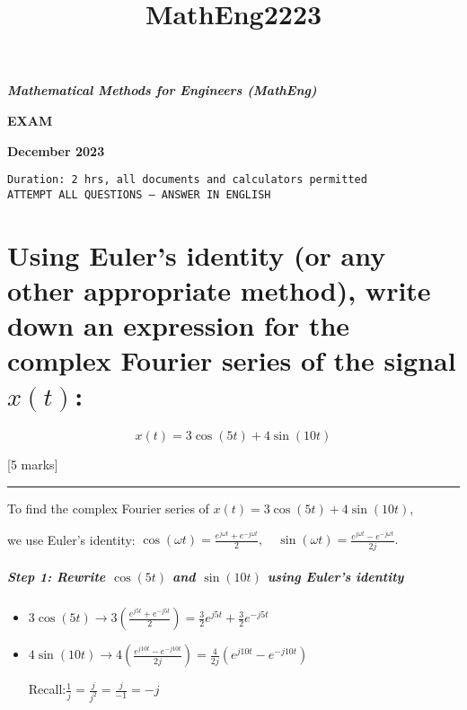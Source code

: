 \documentclass[11pt]{article}
\title{MathEng2223}
\begin{document}
    
    \maketitle
    
    

    
    \textbf{\emph{Mathematical Methods for Engineers (MathEng)}}

\textbf{EXAM}

\textbf{December 2023}

\begin{verbatim}
Duration: 2 hrs, all documents and calculators permitted
ATTEMPT ALL QUESTIONS – ANSWER IN ENGLISH
\end{verbatim}

    \section{\texorpdfstring{Using Euler's identity (or any other
appropriate method), write down an expression for the complex Fourier
series of the signal
\(x(t)\):}{Using Euler's identity (or any other appropriate method), write down an expression for the complex Fourier series of the signal x(t):}}\label{using-eulers-identity-or-any-other-appropriate-method-write-down-an-expression-for-the-complex-fourier-series-of-the-signal-xt}

\[
x(t) = 3 \cos( 5t) + 4 \sin( 10t)
\]

{[}5 marks{]}

    \begin{center}\rule{0.5\linewidth}{0.5pt}\end{center}

To find the complex Fourier series of \(x(t) = 3\cos(5t) + 4\sin(10t)\),

we use Euler's identity:
\(\cos(\omega t) = \frac{e^{j\omega t} + e^{-j\omega t}}{2}, \quad \sin(\omega t) = \frac{e^{j\omega t} - e^{-j\omega t}}{2j}.\)

\subparagraph{\texorpdfstring{Step 1: Rewrite \(\cos(5t)\) and
\(\sin(10t)\) using Euler's
identity}{Step 1: Rewrite \textbackslash cos(5t) and \textbackslash sin(10t) using Euler's identity}}\label{step-1-rewrite-cos5t-and-sin10t-using-eulers-identity}

\begin{itemize}
\item
  \(3\cos(5t) \to 3 ( \frac{e^{j5t} + e^{-j5t}}{2} ) = \frac{3}{2}e^{j5t} + \frac{3}{2}e^{-j5t}\)
\item
  \(4\sin(10t) \to 4(\frac{e^{j10t} - e^{-j10t}}{2j}) = \frac{4}{2j}(e^{j10t} - e^{-j10t})\)

  Recall:\(\frac{1}{j} = \frac{j}{j^2} = \frac{j}{-1} = -j\)
\end{itemize}
\end{document}
